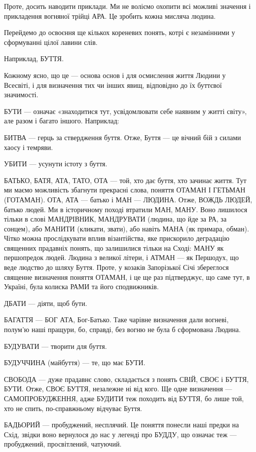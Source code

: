 Проте, досить наводити приклади. Ми не воліємо охопити всі можливі значення і
прикладення вогняної трійці АРА. Це зробить кожна мисляча людина.

Перейдемо до освоєння ще кількох кореневих понять, котрі є незамінними у сформуванні цілої лавини слів.

Наприклад, БУТТЯ.

Кожному ясно, що це — основа основ і для осмислення життя Людини у Всесвіті, і
для визначення тих чи інших явищ, відповідно до їх буттєвої значимості.

БУТИ — означає «знаходитися тут, усвідомлювати себе наявним у житті світу», але
разом і багато іншого. Наприклад:

БИТВА — герць за ствердження буття. Отже, Буття — це вічний бій з силами хаосу
і темряви.

УБИТИ — усунути істоту з буття.

БАТЬКО, БАТЯ, АТА, ТАТО, ОТА — той, хто дає буття, хто зачинає життя. Тут ми
маємо можливість збагнути прекрасні слова, поняття ОТАМАН І ГЕТЬМАН (ГОТАМАН).
ОТА, АТА — батько і МАН — ЛЮДИНА. Отже, ВОЖДЬ ЛЮДЕЙ, батько людей. Ми в
історичному поході втратили МАН, МАНУ. Воно лишилося тільки в слові МАНДРІВНИК,
МАНДРУВАТИ (людина, що йде за РА, за сонцем), або МАНИТИ (кликати, звати), або
навіть МАНА (як примара, обман). Чітко можна прослідкувати вплив візантійства,
яке прискорило деградацію священних прадавніх понять, що залишилися тільки на
Сході: МАНУ як першопредок людей. Людина з великої літери, і АТМАН — як
Першодух, що веде людство до шляху Буття. Проте, у козаків Запорізької Січі
збереглося священне визначення поняття ОТАМАН, і це ще раз підтверджує, що саме
тут, в Україні, була колиска РАМИ та його сподвижників.

ДБАТИ — діяти, щоб бути.

БАГАТТЯ — БОГ АТА, Бог-Батько. Таке чарівне визначення дали вогневі, полум’ю
наші пращури, бо, справді, без вогню не була б сформована Людина.

БУДУВАТИ — творити для буття.

БУДУЧЧИНА (майбуття) — те, що має БУТИ.

СВОБОДА — дуже прадавнє слово, складається з понять СВІЙ, СВОЄ і БУТТЯ, БУТИ.
Отже, СВОЄ БУТТЯ, незалежне ні від кого. Ще одне визначення — САМОПРОБУДЖЕННЯ,
адже БУДИТИ теж походить від БУТТЯ, бо лише той, хто не спить, по-справжньому
відчуває Буття.

БАДЬОРИЙ — пробуджений, несплячий. Це поняття понесли наші предки на Схід,
звідки воно вернулося до нас у легенді про БУДДУ, що означає теж — пробуджений,
просвітлений, чатуючий.

